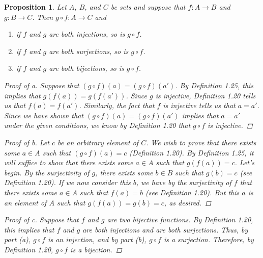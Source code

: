 \documentclass[titlepage]{article}
\newcounter{script}
\newtheorem{proposition}{Proposition}[script]
\begin{document}
\begin{proposition}
    Let $A$, $B$, and $C$ be sets and suppose that $f:A\to B$ and $g:B\to C$. Then $g\circ f:A\to C$ and
    \begin{enumerate}[label={\alph*\textup{)}}]
        \item if $f$ and $g$ are both injections, so is $g\circ f$.
        \item if $f$ and $g$ are both surjections, so is $g\circ f$.
        \item if $f$ and $g$ are both bijections, so is $g\circ f$.
    \end{enumerate}
    \begin{proof}[Proof of a]
        Suppose that $(g\circ f)(a)=(g\circ f)(a')$. By Definition 1.25, this implies that $g(f(a))=g(f(a'))$. Since $g$ is injective, Definition 1.20 tells us that $f(a)=f(a')$. Similarly, the fact that $f$ is injective tells us that $a=a'$. Since we have shown that $(g\circ f)(a)=(g\circ f)(a')$ implies that $a=a'$ under the given conditions, we know by Definition 1.20 that $g\circ f$ is injective.
    \end{proof}
    \begin{proof}[Proof of b]
        Let $c$ be an arbitrary element of $C$. We wish to prove that there exists some $a\in A$ such that $(g\circ f)(a)=c$ (Definition 1.20). By Definition 1.25, it will suffice to show that there exists some $a\in A$ such that $g(f(a))=c$. Let's begin. By the surjectivity of $g$, there exists some $b\in B$ such that $g(b)=c$ (see Definition 1.20). If we now consider this $b$, we have by the surjectivity of $f$ that there exists some $a\in A$ such that $f(a)=b$ (see Definition 1.20). But this $a$ is an element of $A$ such that $g(f(a))=g(b)=c$, as desired.
    \end{proof}
    \begin{proof}[Proof of c]
        Suppose that $f$ and $g$ are two bijective functions. By Definition 1.20, this implies that $f$ and $g$ are both injections and are both surjections. Thus, by part (a), $g\circ f$ is an injection, and by part (b), $g\circ f$ is a surjection. Therefore, by Definition 1.20, $g\circ f$ is a bijection.
    \end{proof}
\end{proposition}




\end{document}
